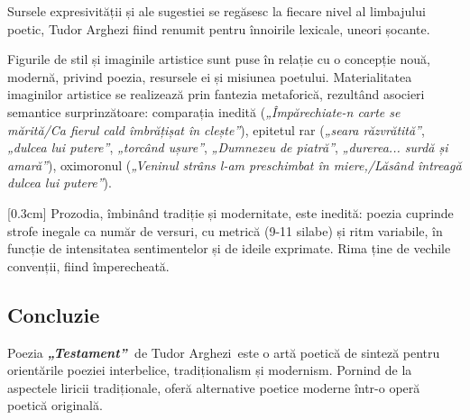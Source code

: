 \documentclass[
12pt,
a4paper
]{article}
\newcommand{\operatitle}{\textbf{\textit{„Testament”\ }}} %
\newcommand{\operaauthor}{Tudor Arghezi\ } %
\begin{document}
Sursele expresivității și ale sugestiei se regăsesc la fiecare nivel al limbajului poetic, Tudor Arghezi fiind renumit pentru înnoirile lexicale, uneori șocante.

Figurile de stil și imaginile artistice sunt puse în relație cu o concepție nouă, modernă, privind poezia, resursele ei și misiunea poetului. Materialitatea imaginilor artistice se realizează prin fantezia metaforică, rezultând asocieri semantice surprinzătoare: comparația inedită (\textit{„Împărechiate-n carte se mărită/Ca fierul cald îmbrățișat în clește”}), epitetul rar (\textit{„seara răzvrătită”}, \textit{„dulcea lui putere”}, \textit{„torcând ușure”}, \textit{„Dumnezeu de piatră”}, \textit{„durerea... surdă și amară”}), oximoronul (\textit{„Veninul strâns l-am preschimbat în miere,/Lăsând întreagă dulcea lui putere”}).

[0.3cm]
Prozodia, îmbinând tradiție și modernitate, este inedită: poezia cuprinde strofe inegale ca număr de versuri, cu metrică (9-11 silabe) și ritm variabile, în funcție de intensitatea sentimentelor și de ideile exprimate. Rima ține de vechile convenții, fiind împerecheată.

\subsection{Concluzie}

Poezia \operatitle de \operaauthor este o artă poetică de sinteză pentru orientările poeziei interbelice, tradiționalism și modernism. Pornind de la aspectele liricii tradiționale, oferă alternative poetice moderne într-o operă poetică originală.
\end{document}
